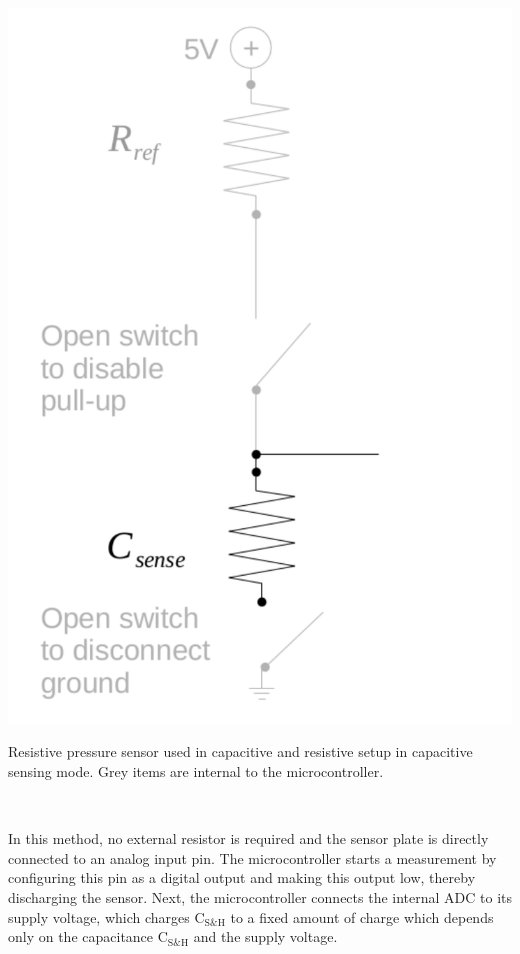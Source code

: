 \documentclass{sigchi-ext}
\begin{document}
\begin{marginfigure}
\begin{minipage}{\marginparwidth}
\centering
\includegraphics[width=0.9\columnwidth]{figures/cap_res_setup_cap}
\caption{Resistive pressure sensor used in capacitive and resistive setup in
capacitive sensing mode. Grey items are internal to the
microcontroller.}~\label{fig:cap_res_setup_cap}
\end{minipage}
\end{marginfigure}

In this method, no external resistor is required and the sensor plate is
directly connected to an analog input pin. The microcontroller starts a
measurement by configuring this pin as a digital output and making this output low,
thereby discharging the sensor. Next, the microcontroller connects the internal
ADC to its supply voltage, which charges $\textrm{C}_{\textrm{S\&H}}$ to a fixed
amount of charge which depends only on the capacitance
$\textrm{C}_{\textrm{S\&H}}$ and the supply voltage.
\end{document}
